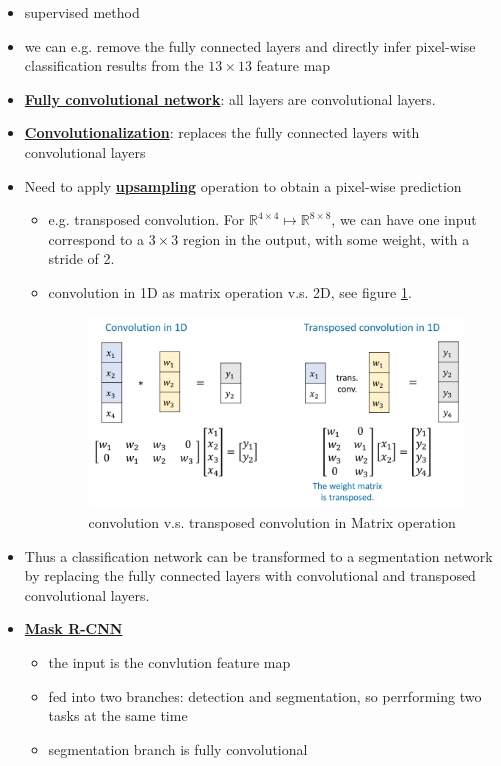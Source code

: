 \documentclass[twocolumn,landscape,10pt]{article}
\theoremstyle{definition}
\begin{document}
\begin{itemize}
    \item supervised method
    \item we can e.g. remove the fully connected layers and
        directly infer pixel-wise classification results 
        from the $13\times 13$ feature map
    \item \underline{\textbf{Fully convolutional network}}: all layers are
        convolutional layers.
    \item \underline{\textbf{Convolutionalization}}: replaces the fully
        connected layers with convolutional layers
    \item Need to apply \underline{\textbf{upsampling}} operation to obtain a
        pixel-wise prediction
        \begin{itemize}
            \item e.g. transposed convolution. 
                For $\mathbb{R}^{4\times 4}\mapsto\mathbb{R}^{8\times 8}$,
                we can have one input correspond to a $3\times 3$ region in the
                output, with some weight, with a stride of 2.
            \item convolution in 1D as matrix operation v.s. 2D, see figure
                \ref{fig:conv1d}.
                \begin{figure}[h]
                  	\includegraphics[scale=0.29]{1d-convolution.png}
                  	\centering
                  	\caption{convolution v.s. transposed convolution in Matrix
                    operation}\label{fig:conv1d}
                \end{figure}
                
        \end{itemize} 
    \item Thus a classification network can be transformed to a segmentation
        network by replacing the fully connected layers with convolutional and
        transposed convolutional layers.
    \item \underline{\textbf{Mask R-CNN}}
        \begin{itemize}
            \item the input is the convlution feature map
            \item fed into two branches: detection and segmentation, so
                perrforming two tasks at the same time
            \item segmentation branch is fully convolutional
        \end{itemize} 
\end{itemize} 
\end{document}
